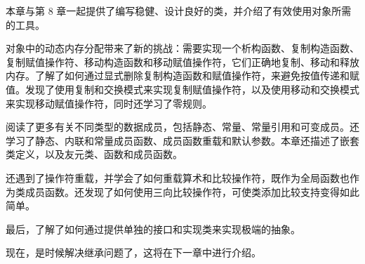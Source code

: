 本章与第 8 章一起提供了编写稳健、设计良好的类，并介绍了有效使用对象所需的工具。

对象中的动态内存分配带来了新的挑战：需要实现一个析构函数、复制构造函数、复制赋值操作符、移动构造函数和移动赋值操作符，它们正确地复制、移动和释放内存。了解了如何通过显式删除复制构造函数和赋值操作符，来避免按值传递和赋值。发现了使用复制和交换模式来实现复制赋值操作符，以及使用移动和交换模式来实现移动赋值操作符，同时还学习了零规则。

阅读了更多有关不同类型的数据成员，包括静态、常量、常量引用和可变成员。还学习了静态、内联和常量成员函数、成员函数重载和默认参数。本章还描述了嵌套类定义，以及友元类、函数和成员函数。

还遇到了操作符重载，并学会了如何重载算术和比较操作符，既作为全局函数也作为类成员函数。还发现了如何使用三向比较操作符，可使类添加比较支持变得如此简单。

最后，了解了如何通过提供单独的接口和实现类来实现极端的抽象。

现在，是时候解决继承问题了，这将在下一章中进行介绍。